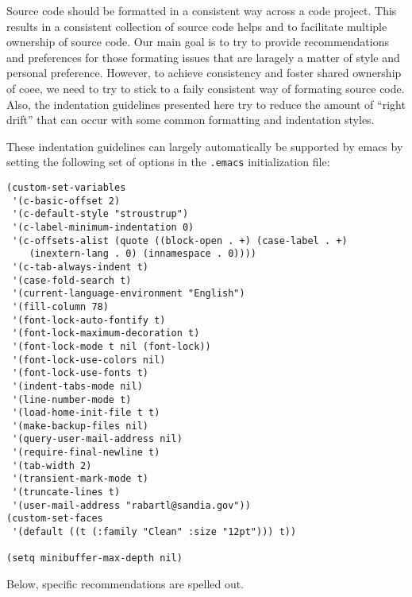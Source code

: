 Source code should be formatted in a consistent way across a code project.
This results in a consistent collection of source code helps and to facilitate
multiple ownership of source code.  Our main goal is to try to provide
recommendations and preferences for those formating issues that are laragely a
matter of style and personal preference.  However, to achieve consistency and
foster shared ownership of coee, we need to try to stick to a faily consistent
way of formating source code.  Also, the indentation guidelines presented here
try to reduce the amount of ``right drift'' that can occur with some common
formatting and indentation styles.


These indentation guidelines can largely automatically be supported by emacs
by setting the following set of options in the {}\texttt{.emacs}
initialization file:

\begin{verbatim}
(custom-set-variables
 '(c-basic-offset 2)
 '(c-default-style "stroustrup")
 '(c-label-minimum-indentation 0)
 '(c-offsets-alist (quote ((block-open . +) (case-label . +)
    (inextern-lang . 0) (innamespace . 0))))
 '(c-tab-always-indent t)
 '(case-fold-search t)
 '(current-language-environment "English")
 '(fill-column 78)
 '(font-lock-auto-fontify t)
 '(font-lock-maximum-decoration t)
 '(font-lock-mode t nil (font-lock))
 '(font-lock-use-colors nil)
 '(font-lock-use-fonts t)
 '(indent-tabs-mode nil)
 '(line-number-mode t)
 '(load-home-init-file t t)
 '(make-backup-files nil)
 '(query-user-mail-address nil)
 '(require-final-newline t)
 '(tab-width 2)
 '(transient-mark-mode t)
 '(truncate-lines t)
 '(user-mail-address "rabartl@sandia.gov"))
(custom-set-faces
 '(default ((t (:family "Clean" :size "12pt"))) t))

(setq minibuffer-max-depth nil)
\end{verbatim}

Below, specific recommendations are spelled out.

